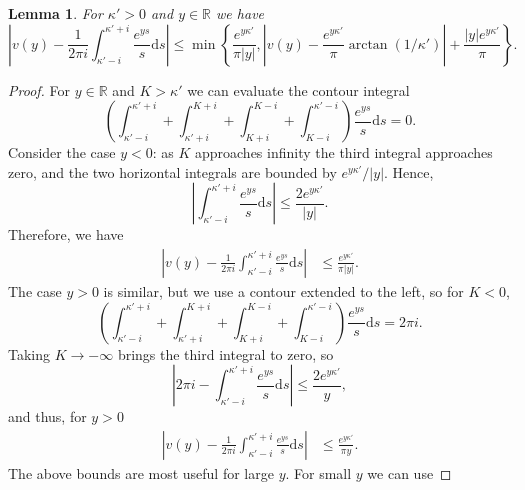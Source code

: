 \documentclass[reqno]{amsart}
\newtheorem{lemma}[theorem]{Lemma}
\numberwithin{equation}{section}
\theoremstyle{remark}
\begin{document}
\begin{lemma}\label{lem:new}
For $\kappa'>0$ and $y\in \mathbb{R}$ we have
\begin{equation}\label{lem}
    \left| v(y) - \frac{1}{2\pi i} \int_{\kappa'-i}^{\kappa'+i} \frac{e^{ys}}{s} \mathrm{d}s \right|  \leq \min\left\lbrace \frac{e^{y\kappa'}}{\pi |y|}, \left| v(y) -\frac{e^{y\kappa'}}{\pi} \arctan(1/\kappa') \right|+\frac{|y|e^{y\kappa'}}{\pi} \right\rbrace.
\end{equation}
\end{lemma}

\begin{proof}
For $y\in\mathbb{R}$ and $K>\kappa'$ we can evaluate the contour integral
\begin{equation*}
    \left( \int_{\kappa'-i}^{\kappa'+i} + \int_{\kappa'+i}^{K+i} + \int_{K+i}^{K-i} + \int_{K-i}^{\kappa'-i} \right) \frac{e^{ys}}{s}\mathrm{d}s = 0.
\end{equation*}
Consider the case $y<0$: as $K$ approaches infinity the third integral approaches zero, and the two horizontal integrals are bounded by $e^{y\kappa'}/|y|$. Hence,
\begin{equation*}
    \left| \int_{\kappa'-i}^{\kappa'+i} \frac{e^{ys}}{s}\mathrm{d}s \right|\leq \frac{2e^{y\kappa'}}{|y|}. 
\end{equation*}
Therefore, we have
\begin{align*}
    \left| v(y) - \frac{1}{2\pi i} \int_{\kappa'-i}^{\kappa'+i} \frac{e^{ys}}{s}\mathrm{d}s \right| &\leq \frac{e^{y\kappa'}}{\pi|y|}.
\end{align*}
The case $y>0$ is similar, but we use a contour extended to the left, so for $K<0$,
\begin{equation*}
    \left( \int_{\kappa'-i}^{\kappa'+i} + \int_{\kappa'+i}^{K+i} + \int_{K+i}^{K-i} + \int_{K-i}^{\kappa'-i} \right) \frac{e^{ys}}{s}\mathrm{d}s = 2\pi i.
\end{equation*}
Taking $K\rightarrow -\infty$ brings the third integral to zero, so
\begin{equation*}
    \left| 2\pi i - \int_{\kappa'-i}^{\kappa'+i} \frac{e^{ys}}{s}\mathrm{d}s \right| \leq \frac{2e^{y\kappa'}}{y},
\end{equation*}
and thus, for $y>0$
\begin{align*}
    \left| v(y) - \frac{1}{2\pi i} \int_{\kappa'-i}^{\kappa'+i} \frac{e^{ys}}{s}\mathrm{d}s \right| &\leq \frac{e^{y\kappa'}}{\pi y}.
\end{align*}
The above bounds are most useful for large $y$. For small $y$ we can use

\end{proof}
\end{document}
